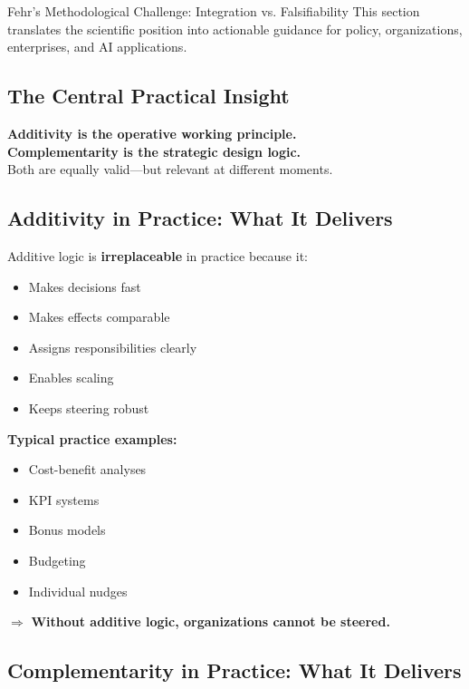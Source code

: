 \begin{chapter}{Fehr's Methodological Challenge: Integration vs. Falsifiability}
This section translates the scientific position into actionable guidance for policy,
organizations, enterprises, and AI applications.

\subsection{The Central Practical Insight}

\begin{tcolorbox}[colback=green!5!white,colframe=green!75!black,title=\textbf{The Practical Translation}]
\begin{center}
\large
\textbf{Additivity is the operative working principle.}\\
\textbf{Complementarity is the strategic design logic.}\\[0.5em]
Both are equally valid---but relevant at different moments.
\end{center}
\end{tcolorbox}

\subsection{Additivity in Practice: What It Delivers}

Additive logic is \textbf{irreplaceable} in practice because it:
\begin{itemize}[noitemsep]
    \item Makes decisions fast
    \item Makes effects comparable
    \item Assigns responsibilities clearly
    \item Enables scaling
    \item Keeps steering robust
\end{itemize}

\textbf{Typical practice examples:}
\begin{itemize}[noitemsep]
    \item Cost-benefit analyses
    \item KPI systems
    \item Bonus models
    \item Budgeting
    \item Individual nudges
\end{itemize}

$\Rightarrow$ \textbf{Without additive logic, organizations cannot be steered.}

\subsection{Complementarity in Practice: What It Delivers}


\end{chapter}
